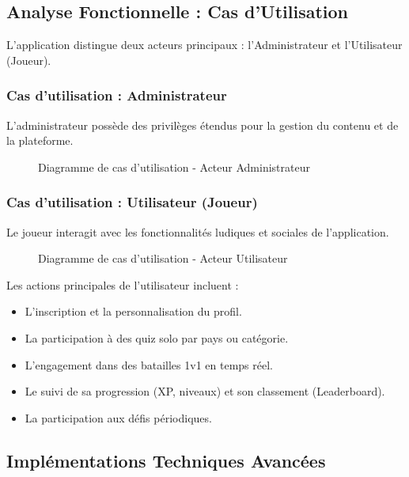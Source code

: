 \subsection{Analyse Fonctionnelle : Cas d'Utilisation}
L'application distingue deux acteurs principaux : l'Administrateur et l'Utilisateur (Joueur).

\subsubsection{Cas d'utilisation : Administrateur}
L'administrateur possède des privilèges étendus pour la gestion du contenu et de la plateforme.
\begin{figure}[H]
    \centering
    
    \caption{Diagramme de cas d'utilisation - Acteur Administrateur}
\end{figure}

\subsubsection{Cas d'utilisation : Utilisateur (Joueur)}
Le joueur interagit avec les fonctionnalités ludiques et sociales de l'application.
\begin{figure}[H]
    \centering
     
    \caption{Diagramme de cas d'utilisation - Acteur Utilisateur}
    \label{fig:usecase_user}
\end{figure}

Les actions principales de l'utilisateur incluent :
\begin{itemize}
    \item L'inscription et la personnalisation du profil.
    \item La participation à des quiz solo par pays ou catégorie.
    \item L'engagement dans des batailles 1v1 en temps réel.
    \item Le suivi de sa progression (XP, niveaux) et son classement (Leaderboard).
    \item La participation aux défis périodiques.
\end{itemize}

\subsection{Implémentations Techniques Avancées}

